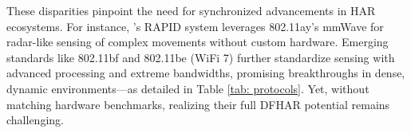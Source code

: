 \documentclass[Afour,sageh,times]{sagej}
\begin{document}
These disparities pinpoint the need for synchronized advancements in HAR ecosystems. For instance, \citep{pegoraro2023rapid}'s RAPID system leverages 802.11ay's mmWave for radar-like sensing of complex movements without custom hardware. Emerging standards like 802.11bf and 802.11be (WiFi 7) further standardize sensing with advanced processing and extreme bandwidths, promising breakthroughs in dense, dynamic environments—as detailed in Table \ref{tab: protocols}. Yet, without matching hardware benchmarks, realizing their full DFHAR potential remains challenging.

\end{document}
